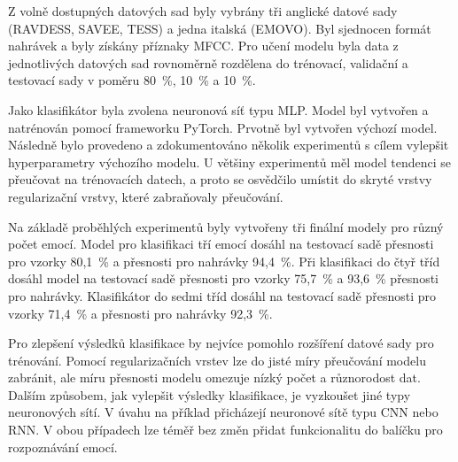 \documentclass[FM,BP]{tulthesis}
\begin{document}
Z volně dostupných datových sad byly vybrány tři anglické datové sady (RAVDESS, SAVEE, TESS) a jedna italská (EMOVO). Byl sjednocen formát nahrávek a byly získány příznaky MFCC. Pro učení modelu byla data z jednotlivých datových sad rovnoměrně rozdělena do trénovací, validační a testovací sady v poměru \mbox{80 \%}, \mbox{10 \%} a \mbox{10 \%}.

Jako klasifikátor byla zvolena neuronová síť typu MLP. Model byl vytvořen a natrénován pomocí frameworku PyTorch. Prvotně byl vytvořen výchozí model. Následně bylo provedeno a zdokumentováno několik experimentů s cílem vylepšit hyperparametry výchozího modelu. U většiny experimentů měl model tendenci se přeučovat na trénovacích datech, a proto se osvědčilo umístit do skryté vrstvy regularizační vrstvy, které zabraňovaly přeučování.

Na základě proběhlých experimentů byly vytvořeny tři finální modely pro různý počet emocí. Model pro klasifikaci tří emocí dosáhl na testovací sadě přesnosti pro vzorky \mbox{80,1 \%} a přesnosti pro nahrávky \mbox{94,4 \%}. Při klasifikaci do čtyř tříd dosáhl model na testovací sadě přesnosti pro vzorky \mbox{75,7 \%} a \mbox{93,6 \%} přesnosti pro nahrávky. Klasifikátor do sedmi tříd dosáhl na testovací sadě přesnosti pro vzorky \mbox{71,4 \%} a přesnosti pro nahrávky \mbox{92,3 \%}.

Pro zlepšení výsledků klasifikace by nejvíce pomohlo rozšíření datové sady pro trénování. Pomocí regularizačních vrstev lze do jisté míry přeučování modelu zabránit, ale míru přesnosti modelu omezuje nízký počet a různorodost dat. Dalším způsobem, jak vylepšit výsledky klasifikace, je vyzkoušet jiné typy neuronových sítí. V úvahu na příklad přicházejí neuronové sítě typu CNN nebo RNN. V obou případech lze téměř bez změn přidat funkcionalitu do balíčku pro rozpoznávání emocí.

\nocite{*}
\printbibliography[title={Použitá literatura}] %
\end{document}
